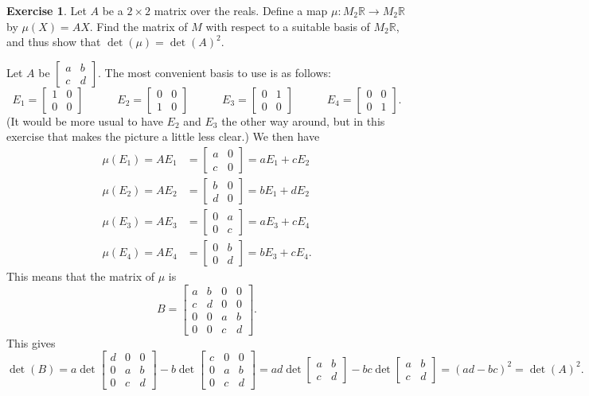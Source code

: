 \documentclass[a4paper]{amsart}
\newcommand{\R}         {{\mathbb{R}}}
\newcommand{\bpm}       {\left[\begin{matrix}}
\newcommand{\epm}       {\end{matrix}\right]}
\newcommand{\tm}        {\times}
\newcommand{\xra}       {\xrightarrow}
\renewcommand{\:}{\colon}
\theoremstyle{definition}
\newtheorem{exercise}{Exercise}
\newenvironment{solution}{{\noindent \bf Solution:}}{}
\begin{document}
\begin{exercise}
 Let $A$ be a $2\tm 2$ matrix over the reals.  Define a map
 $\mu\:M_2\R\xra{}M_2\R$ by $\mu(X)=AX$.  Find the matrix of
 $M$ with respect to a suitable basis of $M_2\R$, and thus
 show that $\det(\mu)=\det(A)^2$.
\end{exercise}
\begin{solution}
 Let $A$ be $\bpm a&b \\ c&d\epm$.  The most convenient
 basis to use is as follows:
 \[ E_1 = \bpm 1&0\\0&0\epm \hspace{3em}
    E_2 = \bpm 0&0\\1&0\epm \hspace{3em}
    E_3 = \bpm 0&1\\0&0\epm \hspace{3em}
    E_4 = \bpm 0&0\\0&1\epm.
 \]
 (It would be more usual to have $E_2$ and $E_3$ the other
 way around, but in this exercise that makes the picture a
 little less clear.)  We then have
 \begin{align*}
  \mu(E_1) = AE_1 &= \bpm a&0\\ c&0 \epm = aE_1+cE_2 \\
  \mu(E_2) = AE_2 &= \bpm b&0\\ d&0 \epm = bE_1+dE_2 \\
  \mu(E_3) = AE_3 &= \bpm 0&a\\ 0&c \epm = aE_3+cE_4 \\
  \mu(E_4) = AE_4 &= \bpm 0&b\\ 0&d \epm = bE_3+cE_4.
 \end{align*}
 This means that the matrix of $\mu$ is 
 \[ B = \bpm a & b & 0 & 0 \\
             c & d & 0 & 0 \\
             0 & 0 & a & b \\
             0 & 0 & c & d \epm.
 \]
 This gives 
 \[ \det(B) = 
     a \det\bpm d&0&0 \\ 0&a&b \\ 0&c&d \epm - 
     b \det\bpm c&0&0 \\ 0&a&b \\ 0&c&d \epm =
     ad\det\bpm a&b \\ c&d\epm - bc\det\bpm a&b\\ c&d\epm =
     (ad-bc)^2 = \det(A)^2.
 \]
\end{solution}

\end{document}
